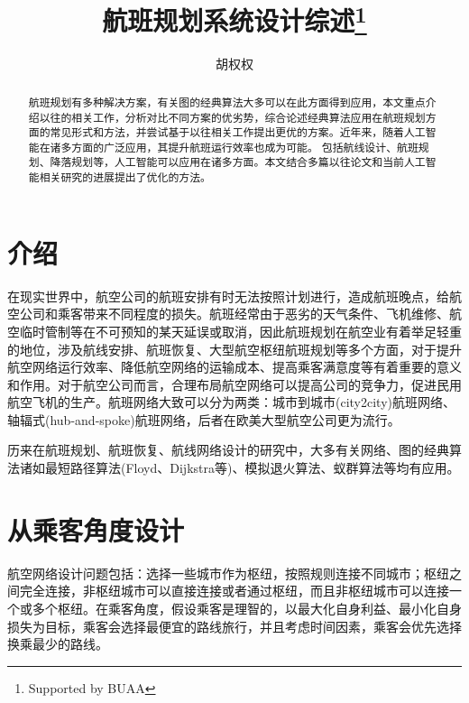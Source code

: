 \documentclass[runningheads]{llncs}
\begin{document}
\title{航班规划系统设计综述\thanks{Supported by BUAA}}
\author{胡权权}
\maketitle
\begin{abstract}
航班规划有多种解决方案，有关图的经典算法大多可以在此方面得到应用，本文重点介绍以往的相关工作，分析对比不同方案的优劣势，综合论述经典算法应用在航班规划方面的常见形式和方法，并尝试基于以往相关工作提出更优的方案。近年来，随着人工智能在诸多方面的广泛应用，其提升航班运行效率也成为可能。 包括航线设计、航班规划、降落规划等，人工智能可以应用在诸多方面。本文结合多篇以往论文和当前人工智能相关研究的进展提出了优化的方法。
\end{abstract}

\section{介绍}
在现实世界中，航空公司的航班安排有时无法按照计划进行，造成航班晚点，给航空公司和乘客带来不同程度的损失。航班经常由于恶劣的天气条件、飞机维修、航空临时管制等在不可预知的某天延误或取消，因此航班规划在航空业有着举足轻重的地位，涉及航线安排、航班恢复、大型航空枢纽航班规划等多个方面，对于提升航空网络运行效率、降低航空网络的运输成本、提高乘客满意度等有着重要的意义和作用。对于航空公司而言，合理布局航空网络可以提高公司的竞争力，促进民用航空飞机的生产。航班网络大致可以分为两类：城市到城市(city2city)航班网络、轴辐式(hub-and-spoke)航班网络，后者在欧美大型航空公司更为流行。

历来在航班规划、航班恢复、航线网络设计的研究中，大多有关网络、图的经典算法诸如最短路径算法(Floyd、Dijkstra等)、模拟退火算法、蚁群算法等均有应用。

\section{从乘客角度设计}
航空网络设计问题包括：选择一些城市作为枢纽，按照规则连接不同城市；枢纽之间完全连接，非枢纽城市可以直接连接或者通过枢纽，而且非枢纽城市可以连接一个或多个枢纽。在乘客角度，假设乘客是理智的，以最大化自身利益、最小化自身损失为目标，乘客会选择最便宜的路线旅行，并且考虑时间因素，乘客会优先选择换乘最少的路线。
\end{document}

